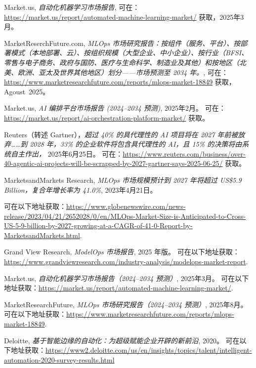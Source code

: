 \documentclass[11pt, a4paper, oneside]{article}
\begin{document}
\newpage
\begin{thebibliography}{99}
    Market.us, \textit{自动化机器学习市场报告}, 可在：\url{https://market.us/report/automated-machine-learning-market/} 获取，2025年3月。
    
    MarketReserchFuture.com, \textit{MLOps 市场研究报告：按组件（服务、平台）、按部署模式（本地部署、云）、按组织规模（大型企业、中小企业）、按行业（BFSI、零售与电子商务、政府与国防、医疗与生命科学、制造业及其他）和按地区（北美、欧洲、亚太及世界其他地区）划分——市场预测至 2034 年。}, 可在：\url{https://www.marketresearchfuture.com/reports/mlops-market-18849} 获取，Agoust~2025。
    
    Market.us, \textit{AI 编排平台市场报告 (2024--2034 预测)}, 2025年2月。  
    可在：\url{https://market.us/report/ai-orchestration-platform-market/} 获取。

    Reuters（转述 Gartner），\textit{超过 40\% 的具代理性的 AI 项目将在 2027 年前被放弃……到 2028 年，33\% 的企业软件将包含具代理性的 AI，且 15\% 的决策将由系统自主作出，} 2025年6月25日。  
    可在：\url{https://www.reuters.com/business/over-40-agentic-ai-projects-will-be-scrapped-by-2027-gartner-says-2025-06-25/} 获取。

    MarketsandMarkets Research, \textit{MLOps 市场规模预计到 2027 年将超过 US\$5.9 Billion，复合年增长率为 41.0\%}, 2023年4月21日。  

    可在以下地址获取：\url{https://www.globenewswire.com/news-release/2023/04/21/2652028/0/en/MLOps-Market-Size-is-Anticipated-to-Cross-US-5-9-billion-by-2027-growing-at-a-CAGR-of-41-0-Report-by-MarketsandMarkets.html}.

    Grand View Research, \textit{ModelOps 市场报告}, 2025 年版。  
    可在以下地址获取：\url{https://www.grandviewresearch.com/industry-analysis/modelops-market-report}.

    Market.us, \textit{自动化机器学习市场报告（2024--2034 预测）}, 2025年3月。  
    可在以下地址获取：\url{https://market.us/report/automated-machine-learning-market/}.

    MarketResearchFuture, \textit{MLOps 市场研究报告（2024--2034 预测）}, 2025年8月。  
    可在以下地址获取：\url{https://www.marketresearchfuture.com/reports/mlops-market-18849}.

    Deloitte, \textit{基于智能边缘的自动化：为超级赋能企业开辟的新前沿}, 2020。 可在以下地址获取：\url{https://www2.deloitte.com/us/en/insights/topics/talent/intelligent-automation-2020-survey-results.html}


\end{thebibliography}
\end{document}
